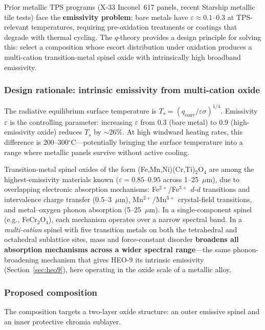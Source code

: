 \documentclass[12pt,letterpaper]{article}
\theoremstyle{definition}
\begin{document}
Prior metallic TPS programs (X-33 Inconel~617 panels, recent Starship metallic tile tests) face the \textbf{emissivity problem}: bare metals have $\varepsilon \approx 0.1$--$0.3$ at TPS-relevant temperatures, requiring pre-oxidation treatments or coatings that degrade with thermal cycling.  The $q$-theory provides a design principle for solving this: select a composition whose escort distribution under oxidation produces a multi-cation transition-metal spinel oxide with intrinsically high broadband emissivity.

\subsubsection{Design rationale: intrinsic emissivity from multi-cation oxide}

The radiative equilibrium surface temperature is $T_s = (q_{\mathrm{conv}} / \varepsilon\sigma)^{1/4}$.  Emissivity $\varepsilon$ is the controlling parameter: increasing $\varepsilon$ from 0.3 (bare metal) to 0.9 (high-emissivity oxide) reduces $T_s$ by $\sim$26\%.  At high windward heating rates, this difference is 200--300$^\circ$C---potentially bringing the surface temperature into a range where metallic panels survive without active cooling.

Transition-metal spinel oxides of the form (Fe,Mn,Ni)(Cr,Ti)$_2$O$_4$ are among the highest-emissivity materials known ($\varepsilon = 0.85$--$0.95$ across 1--25~$\mu$m), due to overlapping electronic absorption mechanisms: Fe$^{2+}$/Fe$^{3+}$ $d$-$d$ transitions and intervalence charge transfer (0.5--3~$\mu$m), Mn$^{2+}$/Mn$^{3+}$ crystal-field transitions, and metal--oxygen phonon absorption (5--25~$\mu$m).  In a single-component spinel (e.g., FeCr$_2$O$_4$), each mechanism operates over a narrow spectral band.  In a \emph{multi-cation} spinel with five transition metals on both the tetrahedral and octahedral sublattice sites, mass and force-constant disorder \textbf{broadens all absorption mechanisms across a wider spectral range}---the same phonon-broadening mechanism that gives HEO-9 its intrinsic emissivity (Section~\ref{sec:heo9}), here operating in the oxide scale of a metallic alloy.

\subsubsection{Proposed composition}

The composition targets a two-layer oxide structure: an outer emissive spinel and an inner protective chromia sublayer.
\end{document}
